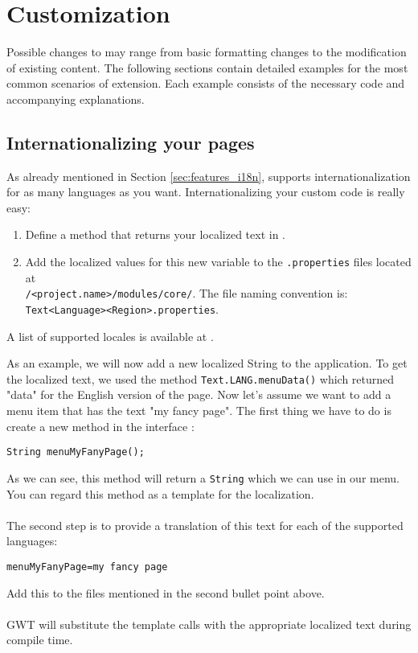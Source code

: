 \section{Customization}
\label{sec:examples}
Possible changes to {\germinate} may range from basic formatting changes to the modification of existing content. The following sections contain detailed examples for the most common scenarios of extension. Each example consists of the necessary code and accompanying explanations.

\subsection{Internationalizing your pages}
\label{sec:example_i18n}
As already mentioned in Section \ref{sec:features_i18n}, {\germinate} supports internationalization for as many languages as you want.
Internationalizing your custom code is really easy:
\begin{enumerate}
    \item Define a method that returns your localized text in .
    \item Add the localized values for this new variable to the \texttt{.properties} files located at\\\instanceStuff\texttt{/<project.name>/modules/core/}. The file naming convention is: \texttt{Text\textunderscore\allowbreak <Language>\allowbreak \textunderscore <Region>.properties}.
\end{enumerate}
\noindent
A list of supported locales is available at \cite{JavaLocales}.

As an example, we will now add a new localized String to the application. To get the localized text, we used the method \texttt{Text.LANG.menuData()} which returned "data" for the English version of the page. Now let's assume we want to add a menu item that has the text "my fancy page". The first thing we have to do is create a new method in the interface :
\begin{lstlisting}[style=Java]
String menuMyFanyPage();
\end{lstlisting}
\noindent
As we can see, this method will return a \texttt{String} which we can use in our menu. You can regard this method as a template for the localization.\\
\\
The second step is to provide a translation of this text for each of the supported languages:
\begin{lstlisting}[style=Properties]
menuMyFanyPage=my fancy page
\end{lstlisting}
Add this to the files mentioned in the second bullet point above.\\
\\
GWT will substitute the template calls with the appropriate localized text during compile time.

